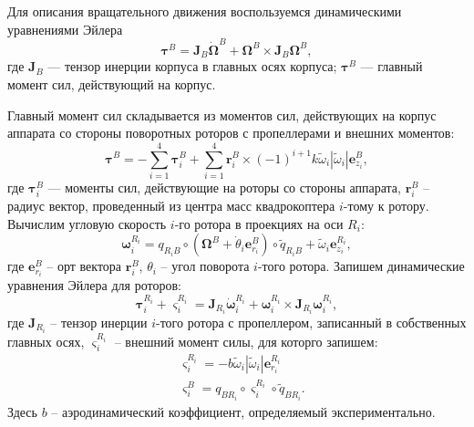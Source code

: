 Для описания вращательного движения воспользуемся динамическими уравнениями Эйлера
\begin{equation} \label{eq:m_rotational_motion}
\bm{\tau}^{B} =
\bm{J}_B\dot{\bm{\Omega}}^B + \bm{\Omega}^B \times \bm{J}_B{\bm{\Omega}^B},
\end{equation}
где $\bm{J}_B$ — тензор инерции корпуса в главных осях корпуса; $\bm{\tau}^{B}$ —
главный момент сил, действующий на корпус.

Главный момент сил складывается из моментов сил, действующих на корпус аппарата со стороны поворотных роторов с пропеллерами и внешних моментов:
\begin{equation} \label{eq:m_general_torq}
\bm{\tau}^{B} =
-\sum_{i=1}^{4} {\bm{\tau}^{B}_i} +
\sum_{i=1}^{4} {\bm{r}^B_i \times (-1)^{i+1} k \tilde \omega_i |\tilde \omega_i| \bm{e}^{B}_{z_i},}
\end{equation}
где $\bm{\tau}^{B}_i$ — моменты сил, действующие на роторы со стороны аппарата, $\bm{r}^B_i$ -- радиус вектор, проведенный из центра масс квадрокоптера $i$-тому к ротору. Вычислим угловую скорость $i$-го ротора в проекциях на оси $R_i$:
\begin{equation} \label{eq:m_prop_ang_vel}
\bm{\omega}^{R_i}_i =
q_{{R_i} B} \circ (\bm{\Omega}^B + \dot {\theta}_i \bm e^B_{r_i}) \circ \tilde {q}_{{R_i}B} +
\tilde \omega_i \bm{e}^{R_i}_{z_i},
\end{equation}
где $\bm e^B_{r_i}$ -- орт вектора $\bm{r}^B_i$, ${\theta}_i$ -- угол поворота $i$-того ротора. Запишем динамические уравнения Эйлера для роторов:
\begin{equation} \label{eq:m_rotors_dyn}
\bm{\tau}^{{R_i}}_i + \bm{\varsigma}^{{R_i}}_{i} = 
\bm{J}_{R_i}\dot{\bm{\omega}}^{R_i}_i + \bm{\omega}^{R_i}_i \times \bm{J}_{R_i}{\bm{\omega}^{R_i}_i},
\end{equation}
где $\bm{J}_{R_i}$ -- тензор инерции $i$-того ротора с пропеллером, записанный в собственных главных осях, $\bm{\varsigma}^{{R_i}}_{i}$ -- внешний момент силы, для которго запишем:
\begin{equation} \label{eq:m_ext_torq}
\begin{aligned}
&\bm{\varsigma}^{{R_i}}_{i} = -b \tilde \omega_i |\tilde \omega_i| \bm e^{R_i}_{r_i}\\
&\bm{\varsigma}^{B}_{i} = q_{ B {R_i}} \circ \bm{\varsigma}^{{R_i}}_{i} \circ \tilde q_{ B {R_i}}.
\end{aligned}
\end{equation}
Здесь $b$ -- аэродинамический коэффициент, определяемый экспериментально.

